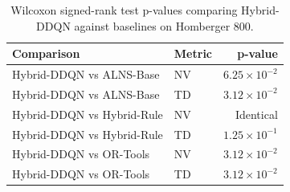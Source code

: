 \begin{table}[htbp]
\centering
\caption{Wilcoxon signed-rank test p-values comparing Hybrid-DDQN against baselines on Homberger 800.}
\label{tab:wilcoxon_homberger_800}
\begin{tabular}{llr}
\hline
\textbf{Comparison} & \textbf{Metric} & \textbf{p-value} \\ \hline
Hybrid-DDQN vs ALNS-Base & NV & $6.25 \times 10^{-2}$ \\
Hybrid-DDQN vs ALNS-Base & TD & $3.12 \times 10^{-2}$ \\
Hybrid-DDQN vs Hybrid-Rule & NV & Identical \\
Hybrid-DDQN vs Hybrid-Rule & TD & $1.25 \times 10^{-1}$ \\
Hybrid-DDQN vs OR-Tools & NV & $3.12 \times 10^{-2}$ \\
Hybrid-DDQN vs OR-Tools & TD & $3.12 \times 10^{-2}$ \\
\hline
\end{tabular}
\end{table}
